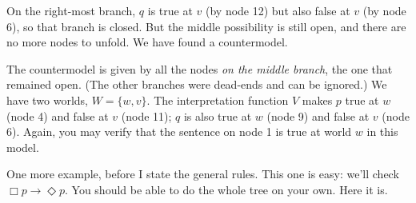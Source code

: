 \begin{center}
\end{center}
%
On the right-most branch, $q$ is true at $v$ (by node 12) but also false at $v$
(by node 6), so that branch is closed. But the middle possibility is still open,
and there are no more nodes to unfold. We have found a countermodel.

The countermodel is given by all the nodes \emph{on the middle branch},
the one that remained open. (The other branches were dead-ends and can be
ignored.) We have two worlds, $W = \{ w,v \}$. The interpretation function $V$
makes $p$ true at $w$ (node 4) and false at $v$ (node 11); $q$ is also true at
$w$ (node 9) and false at $v$ (node 6). Again, you may verify that the sentence
on node 1 is true at world $w$ in this model.

One more example, before I state the general rules. This one is easy: we'll
check $\Box p \to \Diamond p$. You should be able to do the whole tree on your
own. Here it is.
%
\begin{center}
\end{center}

